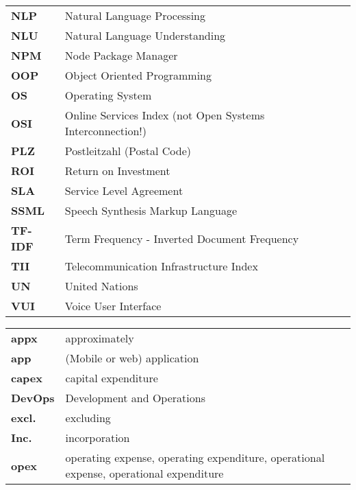 \begin{flushleft}
\begin{tabular}{ll}
\textbf{NLP}	&	Natural Language Processing\\
\textbf{NLU}	&	Natural Language Understanding\\
\textbf{NPM}	&	Node Package Manager\\

\textbf{OOP}		&	Object Oriented Programming\\
\textbf{OS}		&	Operating System\\
\textbf{OSI}	&	Online Services Index (not Open Systems Interconnection!)\\
\textbf{PLZ}	&	Postleitzahl (Postal Code)\\

\textbf{ROI}	&	Return on Investment\\
\textbf{SLA}	&	Service Level Agreement\\
\textbf{SSML}	&	Speech Synthesis Markup Language\\

\textbf{TF-IDF}	&	Term Frequency - Inverted Document Frequency\\
\textbf{TII}	&	Telecommunication Infrastructure Index\\

\textbf{UN}		&	United Nations\\

\textbf{VUI}	&	Voice User Interface\\




\end{tabular}
\end{flushleft}


\begin{flushleft}
	\begin{tabular}{ll}
		
\textbf{appx}	&	approximately\\
\textbf{app}	&	(Mobile or web) application\\
\textbf{capex}	&	capital expenditure\\
\textbf{DevOps}	&	Development and Operations\\
\textbf{excl.}	& 	excluding\\
\textbf{Inc.}	&	incorporation\\
\textbf{opex}	& 	operating expense, operating expenditure, operational expense, operational expenditure \\
\end{tabular}
\end{flushleft}


